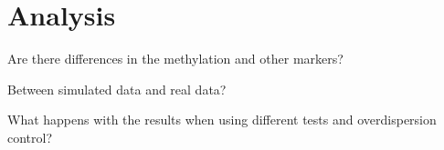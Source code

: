 \section{Analysis}

Are there differences in the methylation and other markers?

Between simulated data and real data?

What happens with the results when using different tests and overdispersion control?
  
  